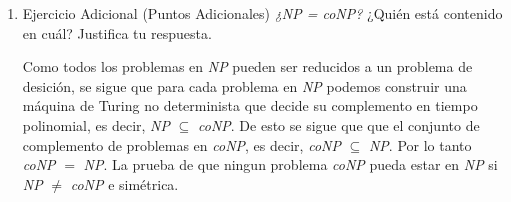 \documentclass[11pt,letterpaper]{report}
\begin{document}
\begin{enumerate}
\item Ejercicio Adicional (Puntos Adicionales)
\textit{¿NP = coNP?} ¿Quién está contenido en cuál? Justifica tu respuesta.

Como todos los problemas en \textit{NP} pueden ser reducidos a un problema de desición, se sigue que
para cada problema en \textit{NP} podemos construir una máquina de Turing no determinista que decide
su complemento en tiempo polinomial, es decir, \textit{NP} $\subseteq$ \textit{coNP}. De esto se
sigue que que el conjunto de complemento de problemas en \textit{coNP}, es decir,
\textit{coNP} $\subseteq$ \textit{NP}. Por lo tanto \textit{coNP} $=$ \textit{NP}. La prueba de que 
ningun problema \textit{coNP} pueda estar en \textit{NP} si \textit{NP} $\not =$ \textit{coNP} e
simétrica.

\end{enumerate}

\nocite{*}








\end{document}
